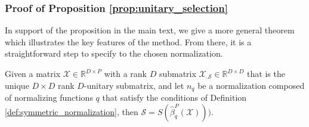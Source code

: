 \subsubsection{Proof of Proposition \ref{prop:unitary_selection}}
\label{sec:local_isometry_proof}

In support of the proposition in the main text, we give a more general theorem which illustrates the key features of the method.
From there, it is a straightforward step to specify to the chosen normalization.

 \begin{proposition}
\label{prop:generalized_unitary_selection}
Given a matrix $\mathcal X \in \mathbb R^{D \times P}$ with a rank $D$ submatrix $\mathcal X_{.\mathcal S} \in \mathbb R^{D \times D}$ that is the unique $D \times D$ rank $D$-unitary submatrix, and let $n_q$ be a normalization composed of normalizing functions $q$ that satisfy the conditions of Definition \ref{def:symmetric_normalization}, then  $\mathcal S = S(\widehat{\beta}_{q}^P (\mathcal X)))$.
 \end{proposition}
 
